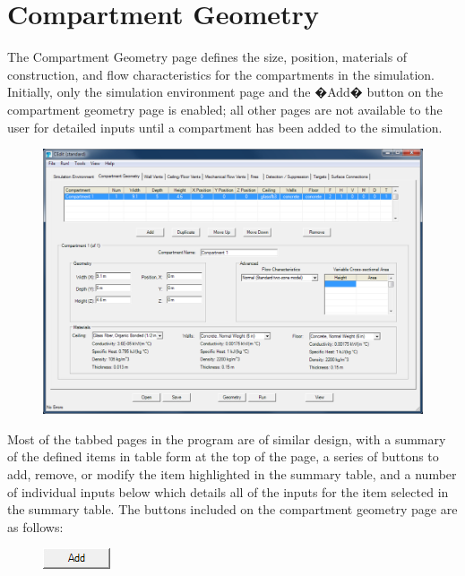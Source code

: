 \newpage
\section{Compartment Geometry}

The Compartment Geometry page defines the size, position, materials of construction, and flow characteristics for the compartments in the simulation. Initially, only the simulation environment page and the �Add� button on the compartment geometry page is enabled; all other pages are not available to the user for detailed inputs until a compartment has been added to the simulation.  

\begin{figure}[h!]
\begin{center}
\includegraphics[width=6.5in]{FIGURES/Input_File/Compartment_Geometry_Tab}
\end{center}
\end{figure}

Most of the tabbed pages in the program are of similar design, with a summary of the defined items in table form at the top of the page, a series of buttons to add, remove, or modify the item highlighted in the summary table, and a number of individual inputs below which details all of the inputs for the item selected in the summary table. The buttons included on the compartment geometry page are as follows: \\

\begin{figure}
  \includegraphics[width=0.781in]{FIGURES/Input_File/Add_Button}
\end{figure}

